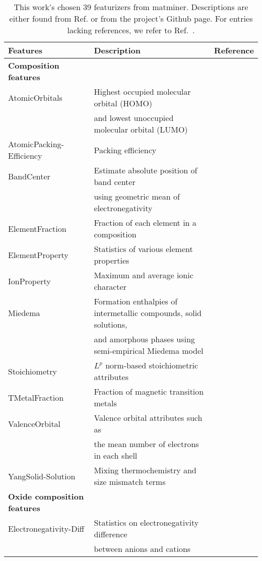 \begin{center}
\begin{longtable}{M{3.5cm} M{6.5cm} M{2.0cm}}
\caption{This work's chosen 39 featurizers from matminer. Descriptions are either found from Ref. \cite{Ward2018} or from the project's Github page. For entries lacking references, we refer to Ref.~\cite{Ward2018}.}
\label{table:featurizers} 
\hline
Features & Description & Reference \\
\hline 
  \textbf{Composition features} & & \\ 
  AtomicOrbitals & Highest occupied molecular orbital (HOMO) & \cite{Kotochigova1997}  \\   
   & and lowest unoccupied molecular orbital (LUMO) &  \\   
  AtomicPacking-Efficiency & Packing efficiency & \cite{Laws2015}  \\   
  BandCenter & Estimate absolute position of band center  & \cite{Butler1978} \\   
   & using geometric mean of electronegativity &  \\  
  ElementFraction & Fraction of each element in a composition &    \\   
  ElementProperty & Statistics of various element properties & \cite{Ong2013,Ward2016, Deml2016}  \\   
  IonProperty & Maximum and average ionic character & \cite{Ward2016} \\   
  Miedema & Formation enthalpies of intermetallic compounds, solid solutions, & \cite{Weeber1987} \\   
   & and amorphous phases using semi-empirical Miedema model &  \\   
  Stoichiometry & $L^p$ norm-based stoichiometric attributes & \cite{Ward2016} \\   
  TMetalFraction & Fraction of magnetic transition metals & \cite{Deml2016}  \\   
  ValenceOrbital & Valence orbital attributes such as & \cite{Ward2016}  \\   
   &  the mean number of electrons in each shell &   \\   
  YangSolid-Solution & Mixing thermochemistry and size mismatch terms & \cite{Yang2012} \\
    \hline 
  \textbf{Oxide composition features} &  &  \\
  Electronegativity-Diff & Statistics on electronegativity difference & \cite{Deml2016} \\   
   &  between anions and cations & \\ 

\end{longtable}
\end{center}
